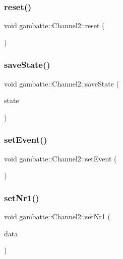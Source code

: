 \subsubsection{\texorpdfstring{reset()}{reset()}}
{\footnotesize\ttfamily void gambatte\+::\+Channel2\+::reset (\begin{DoxyParamCaption}{ }\end{DoxyParamCaption})}

\mbox{\label{classgambatte_1_1Channel2_a65e1566e37749fa686bf5f607fc10161}} 
\subsubsection{\texorpdfstring{save\+State()}{saveState()}}
{\footnotesize\ttfamily void gambatte\+::\+Channel2\+::save\+State (\begin{DoxyParamCaption}\item[{\hyperlink{structgambatte_1_1SaveState}{Save\+State} \&}]{state }\end{DoxyParamCaption})}

\mbox{\label{classgambatte_1_1Channel2_aef1eba3499906c82587cbd0eb5121e5f}} 
\subsubsection{\texorpdfstring{set\+Event()}{setEvent()}}
{\footnotesize\ttfamily void gambatte\+::\+Channel2\+::set\+Event (\begin{DoxyParamCaption}{ }\end{DoxyParamCaption})\hspace{0.3cm}{\ttfamily [private]}}

\mbox{\label{classgambatte_1_1Channel2_a77f0fdaa9b46038ece53181518bdb2cf}} 
\subsubsection{\texorpdfstring{set\+Nr1()}{setNr1()}}
{\footnotesize\ttfamily void gambatte\+::\+Channel2\+::set\+Nr1 (\begin{DoxyParamCaption}\item[{unsigned}]{data }\end{DoxyParamCaption})}

